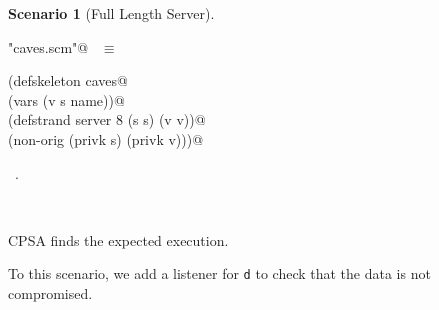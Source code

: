 \documentclass[titlepage,12pt]{article}
\theoremstyle{definition}
\newtheorem{scenario}{Scenario}
\begin{document}
\begin{scenario}[Full Length Server]\label{scene:full length server}
\begin{flushleft} \small
\begin{minipage}{\linewidth} \label{scrap30}
\verb@"caves.scm"@\nobreak\ {\footnotesize {} }$\equiv$
\vspace{-1ex}
\begin{list}{}{} \item
\mbox{}\verb@(defskeleton caves@\\
\mbox{}\verb@  (vars (v s name))@\\
\mbox{}\verb@  (defstrand server 8 (s s) (v v))@\\
\mbox{}\verb@  (non-orig (privk s) (privk v)))@{\NWsep}
\end{list}
\vspace{-1ex}
\footnotesize\addtolength{\baselineskip}{-1ex}
\begin{list}{}{\setlength{\itemsep}{-\parsep}\setlength{\itemindent}{-\leftmargin}}
\item \NWtxtFileDefBy\ .
\end{list}
\end{minipage}\\[4ex]
\end{flushleft}
\end{scenario}

CPSA finds the expected execution.

To this scenario, we add a listener for \texttt{d} to
check that the data is not compromised.
\end{document}

